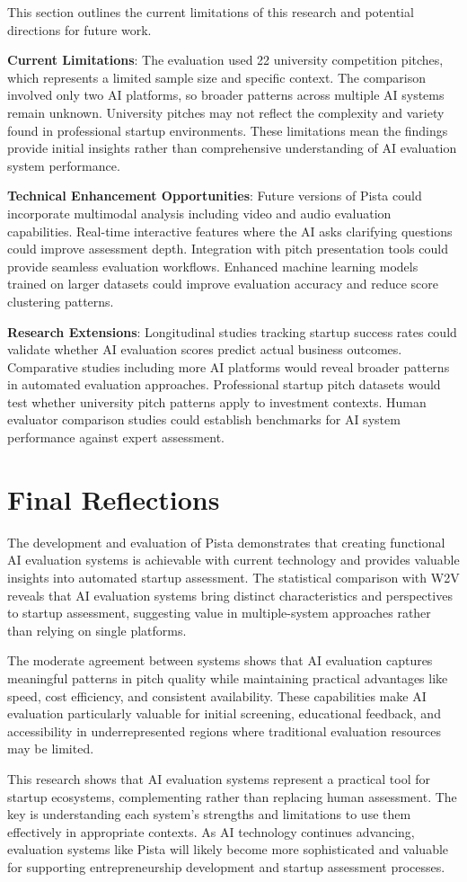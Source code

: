 This section outlines the current limitations of this research and potential directions for future work.

\textbf{Current Limitations}: The evaluation used 22 university competition pitches, which represents a limited sample size and specific context. The comparison involved only two AI platforms, so broader patterns across multiple AI systems remain unknown. University pitches may not reflect the complexity and variety found in professional startup environments. These limitations mean the findings provide initial insights rather than comprehensive understanding of AI evaluation system performance.

\textbf{Technical Enhancement Opportunities}: Future versions of Pista could incorporate multimodal analysis including video and audio evaluation capabilities. Real-time interactive features where the AI asks clarifying questions could improve assessment depth. Integration with pitch presentation tools could provide seamless evaluation workflows. Enhanced machine learning models trained on larger datasets could improve evaluation accuracy and reduce score clustering patterns.

\textbf{Research Extensions}: Longitudinal studies tracking startup success rates could validate whether AI evaluation scores predict actual business outcomes. Comparative studies including more AI platforms would reveal broader patterns in automated evaluation approaches. Professional startup pitch datasets would test whether university pitch patterns apply to investment contexts. Human evaluator comparison studies could establish benchmarks for AI system performance against expert assessment.

\section{Final Reflections}
\label{sec:final-thoughts}

The development and evaluation of Pista demonstrates that creating functional AI evaluation systems is achievable with current technology and provides valuable insights into automated startup assessment. The statistical comparison with W2V reveals that AI evaluation systems bring distinct characteristics and perspectives to startup assessment, suggesting value in multiple-system approaches rather than relying on single platforms.

The moderate agreement between systems shows that AI evaluation captures meaningful patterns in pitch quality while maintaining practical advantages like speed, cost efficiency, and consistent availability. These capabilities make AI evaluation particularly valuable for initial screening, educational feedback, and accessibility in underrepresented regions where traditional evaluation resources may be limited.

This research shows that AI evaluation systems represent a practical tool for startup ecosystems, complementing rather than replacing human assessment. The key is understanding each system's strengths and limitations to use them effectively in appropriate contexts. As AI technology continues advancing, evaluation systems like Pista will likely become more sophisticated and valuable for supporting entrepreneurship development and startup assessment processes.